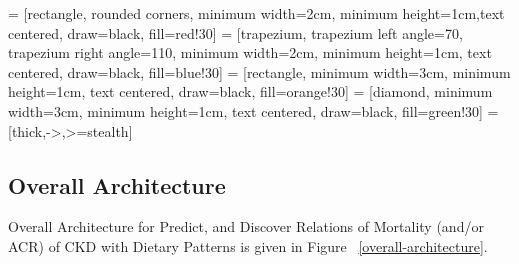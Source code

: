  = [rectangle, rounded corners, minimum width=2cm, minimum height=1cm,text centered, draw=black, fill=red!30]
 = [trapezium, trapezium left angle=70, trapezium right angle=110, minimum width=2cm, minimum height=1cm, text centered, draw=black, fill=blue!30]
 = [rectangle, minimum width=3cm, minimum height=1cm, text centered, draw=black, fill=orange!30]
 = [diamond, minimum width=3cm, minimum height=1cm, text centered, draw=black, fill=green!30]
 = [thick,->,>=stealth]

\subsection{Overall Architecture}
Overall Architecture for  Predict, and Discover Relations of Mortality (and/or ACR) of CKD with Dietary Patterns is given in Figure ~\ref{overall-architecture}.
